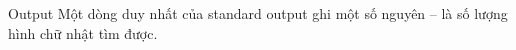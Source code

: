 Output
Một dòng duy nhất của standard output ghi một số nguyên – là số lượng hình chữ nhật tìm được.